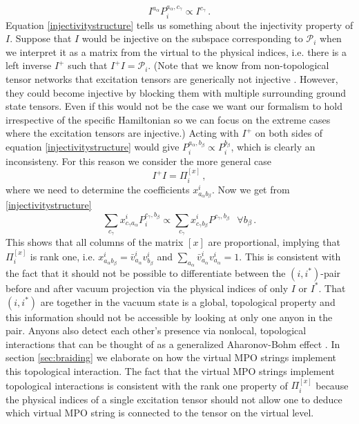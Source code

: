 \documentclass[12 pt]{article}
\begin{document}
\begin{equation} \label{injectivitystructure}
    I^{a_\alpha} P_i^{a_\alpha,c_\gamma} \propto I^{c_\gamma}\, .
\end{equation}
Equation \eqref{injectivitystructure} tells us something about the injectivity property of $I$. Suppose that $I$ would be injective on the subspace corresponding to $\mathcal{P}_i$ when we interpret it as a matrix from the virtual to the physical indices, i.e. there is a left inverse $I^+$ such that $I^+I = \mathcal{P}_i$. (Note that we know from non-topological tensor networks that excitation tensors are generically not injective \cite{Haegeman,Vanderstraeten}. However, they could become injective by blocking them with multiple surrounding ground state tensors. Even if this would not be the case we want our formalism to hold irrespective of the specific Hamiltonian so we can focus on the extreme cases where the excitation tensors are injective.) Acting with $I^+$ on both sides of equation \eqref{injectivitystructure} would give $P_i^{a_\alpha,b_\beta} \propto P_i^{b_\beta}$, which is clearly an inconsisteny. For this reason we consider the more general case
\begin{equation}
    I^+I = \Pi^{[x]}_i\, ,
\end{equation}
where we need to determine the coefficients $x^i_{a_\alpha b_\beta}$. Now we get from \eqref{injectivitystructure}
\begin{equation}
    \sum_{c_\gamma} x^i_{c_\gamma a_\alpha} P_i^{c_\gamma ,b_\beta} \propto \sum_{c_\gamma} x^i_{c_\gamma b_\beta} P^{c_\gamma ,b_\beta}\,\;\;\forall b_\beta\, .
\end{equation}
This shows that all columns of the matrix $[x]$ are proportional, implying that $\Pi_i^{[x]}$ is rank one, i.e. $x^i_{a_\alpha b_\beta} = \bar{v}^i_{a_\alpha} v^i_{b_\beta}$ and $\sum_{a_\alpha} \bar{v}^i_{a_\alpha}v^i_{a_\alpha} = 1$. This is consistent with the fact that it should not be possible to differentiate between the $(i,i^*)$-pair before and after vacuum projection via the physical indices of only $I$ or $I^*$. That $(i,i^*)$ are together in the vacuum state is a global, topological property and this information should not be accessible by looking at only one anyon in the pair.  Anyons also detect each other's presence via nonlocal, topological interactions that can be thought of as a generalized Aharonov-Bohm effect \cite{AharonovBohm}. In section \ref{sec:braiding} we elaborate on how the virtual MPO strings implement this topological interaction. The fact that the virtual MPO strings implement topological interactions is consistent with the rank one property of $\Pi_i^{[x]}$ because the physical indices of a single excitation tensor should not allow one to deduce which virtual MPO string is connected to the tensor on the virtual level.
\end{document}
